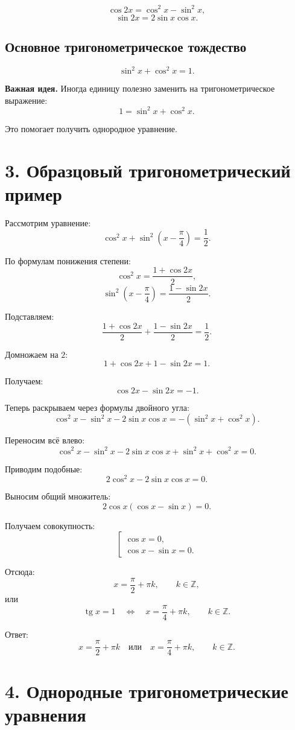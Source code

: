 \documentclass[a4paper,12pt]{article}
\providecommand{\tg}{\mathop{\mathrm{tg}}\nolimits}
\newcommand{\important}[1]{\textcolor{darkaccent}{\textbf{#1}}}
\begin{document}
\[
\cos 2x=\cos^2 x-\sin^2 x,
\]
\[
\sin 2x=2\sin x\cos x.
\]

\subsection*{Основное тригонометрическое тождество}

\[
\sin^2 x+\cos^2 x=1.
\]

\important{Важная идея.} Иногда единицу полезно заменить на тригонометрическое выражение:
\[
1=\sin^2 x+\cos^2 x.
\]

Это помогает получить однородное уравнение.

\section*{3. Образцовый тригонометрический пример}

Рассмотрим уравнение:
\[
\cos^2x+\sin^2\left(x-\frac{\pi}{4}\right)=\frac12.
\]

По формулам понижения степени:
\[
\cos^2x=\frac{1+\cos2x}{2},
\]
\[
\sin^2\left(x-\frac{\pi}{4}\right)=\frac{1-\sin2x}{2}.
\]

Подставляем:
\[
\frac{1+\cos2x}{2}
+
\frac{1-\sin2x}{2}
=
\frac12.
\]

Домножаем на $2$:
\[
1+\cos2x+1-\sin2x=1.
\]

Получаем:
\[
\cos2x-\sin2x=-1.
\]

Теперь раскрываем через формулы двойного угла:
\[
\cos^2x-\sin^2x-2\sin x\cos x
=
-\left(\sin^2x+\cos^2x\right).
\]

Переносим всё влево:
\[
\cos^2x-\sin^2x-2\sin x\cos x+\sin^2x+\cos^2x=0.
\]

Приводим подобные:
\[
2\cos^2x-2\sin x\cos x=0.
\]

Выносим общий множитель:
\[
2\cos x(\cos x-\sin x)=0.
\]

Получаем совокупность:
\[
\left[
\begin{array}{l}
\cos x=0,\\
\cos x-\sin x=0.
\end{array}
\right.
\]

Отсюда:
\[
x=\frac{\pi}{2}+\pi k,
\qquad k\in\mathbb Z,
\]
или
\[
\tg x=1
\quad\Longleftrightarrow\quad
x=\frac{\pi}{4}+\pi k,
\qquad k\in\mathbb Z.
\]

Ответ:
\[
\boxed{
x=\frac{\pi}{2}+\pi k
\quad\text{или}\quad
x=\frac{\pi}{4}+\pi k,
\qquad k\in\mathbb Z.
}
\]

\section*{4. Однородные тригонометрические уравнения}
\end{document}
